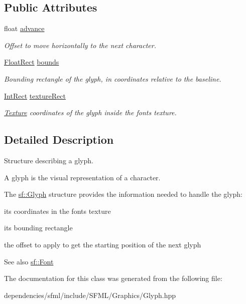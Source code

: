 \subsection*{Public Attributes}
\begin{DoxyCompactItemize}
\item 
\mbox{\label{classsf_1_1_glyph_aeac19b97ec11409147191606b784deda}} 
float \hyperlink{classsf_1_1_glyph_aeac19b97ec11409147191606b784deda}{advance}
\begin{DoxyCompactList}\small\item\em Offset to move horizontally to the next character. \end{DoxyCompactList}\item 
\mbox{\label{classsf_1_1_glyph_a6f3c892093167914adc31e52e5923f4b}} 
\hyperlink{classsf_1_1_rect}{Float\+Rect} \hyperlink{classsf_1_1_glyph_a6f3c892093167914adc31e52e5923f4b}{bounds}
\begin{DoxyCompactList}\small\item\em Bounding rectangle of the glyph, in coordinates relative to the baseline. \end{DoxyCompactList}\item 
\mbox{\label{classsf_1_1_glyph_a0d502d326449f8c49011ed91d2805f5b}} 
\hyperlink{classsf_1_1_rect}{Int\+Rect} \hyperlink{classsf_1_1_glyph_a0d502d326449f8c49011ed91d2805f5b}{texture\+Rect}
\begin{DoxyCompactList}\small\item\em \hyperlink{classsf_1_1_texture}{Texture} coordinates of the glyph inside the font\textquotesingle{}s texture. \end{DoxyCompactList}\end{DoxyCompactItemize}


\subsection{Detailed Description}
Structure describing a glyph. 

A glyph is the visual representation of a character.

The \hyperlink{classsf_1_1_glyph}{sf\+::\+Glyph} structure provides the information needed to handle the glyph\+: \begin{DoxyItemize}
\item its coordinates in the font\textquotesingle{}s texture \item its bounding rectangle \item the offset to apply to get the starting position of the next glyph\end{DoxyItemize}
\begin{DoxySeeAlso}{See also}
\hyperlink{classsf_1_1_font}{sf\+::\+Font} 
\end{DoxySeeAlso}


The documentation for this class was generated from the following file\+:\begin{DoxyCompactItemize}
\item 
dependencies/sfml/include/\+S\+F\+M\+L/\+Graphics/Glyph.\+hpp\end{DoxyCompactItemize}
